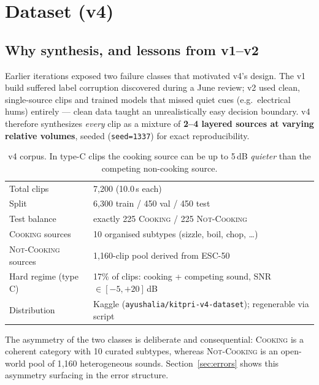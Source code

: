 \documentclass[11pt,a4paper]{article}
\newcommand{\cooking}{\textsc{Cooking}}
\newcommand{\notcooking}{\textsc{Not-Cooking}}
\begin{document}
\section{Dataset (v4)}\label{sec:data}

\subsection{Why synthesis, and lessons from v1--v2}
Earlier iterations exposed two failure classes that motivated v4's design.
The v1 build suffered label corruption discovered during a June review; v2
used clean, single-source clips and trained models that missed quiet cues
(e.g.\ electrical hums) entirely --- clean data taught an unrealistically easy
decision boundary. v4 therefore synthesizes \emph{every} clip as a mixture of
\textbf{2--4 layered sources at varying relative volumes}, seeded
(\texttt{seed=1337}) for exact reproducibility.

\begin{table}[h]
\centering\small
\begin{tabular}{@{}ll@{}}
\toprule
Total clips & 7{,}200 (10.0\,s each) \\
Split       & 6{,}300 train / 450 val / 450 test \\
Test balance& exactly 225 \cooking{} / 225 \notcooking{} \\
\cooking{} sources    & 10 organised subtypes (sizzle, boil, chop, \dots) \\
\notcooking{} sources & 1{,}160-clip pool derived from ESC-50 \\
Hard regime (type C)  & 17\% of clips: cooking + competing sound, SNR $\in[-5, +20]$\,dB \\
Distribution & Kaggle (\texttt{ayushalia/kitpri-v4-dataset}); regenerable via script \\
\bottomrule
\end{tabular}
\caption{v4 corpus. In type-C clips the cooking source can be up to 5\,dB
\emph{quieter} than the competing non-cooking source.}
\label{tab:dataset}
\end{table}

The asymmetry of the two classes is deliberate and consequential: \cooking{}
is a coherent category with 10 curated subtypes, whereas \notcooking{} is an
open-world pool of 1{,}160 heterogeneous sounds. Section~\ref{sec:errors}
shows this asymmetry surfacing in the error structure.
\end{document}
